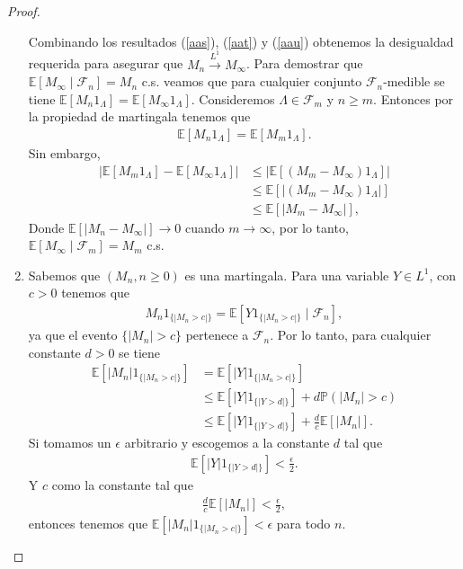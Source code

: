 \begin{proof}
\begin{enumerate}
Combinando los resultados (\ref{aas}), (\ref{aat}) y (\ref{aau}) obtenemos la desigualdad requerida para asegurar que $M_n \xrightarrow{L^1} M_{\infty}$. Para demostrar que $\mathbb{E}\left[M_{\infty} \mid \mathcal{F}_n\right] = M_n$ c.s. veamos que para cualquier conjunto $\mathcal{F}_n$-medible se tiene $\mathbb{E}[M_n 1_{\Lambda}] = \mathbb{E}[M_{\infty} 1_{\Lambda}]$. Consideremos $\Lambda \in \mathcal{F}_m$ y $n \geq m$. Entonces por la propiedad de martingala tenemos que
	\begin{align*}
	\mathbb{E}[M_n 1_{\Lambda}] = \mathbb{E}[M_m 1_{\Lambda}].
	\end{align*}
Sin embargo, 
	\begin{align*}
	|\mathbb{E}[M_m 1_{\Lambda}] - \mathbb{E}[M_{\infty} 1_{\Lambda}]| & \leq |\mathbb{E}[(M_m - M_{\infty}) 1_{\Lambda}]| \\
	& \leq \mathbb{E}[|(M_m - M_{\infty}) 1_{\Lambda}|] \\
	& \leq \mathbb{E}[|M_m - M_{\infty}|],
	\end{align*}
Donde $\mathbb{E}[|M_n - M_{\infty}|] \rightarrow 0$ cuando $m \rightarrow \infty$, por lo tanto, $\mathbb{E}[M_{\infty} \mid \mathcal{F}_m] = M_m$ c.s.

\item Sabemos que $(M_n, n \geq 0)$ es una martingala. Para una variable $Y \in L^1$, con $c > 0$ tenemos que
	\begin{align*}
	M_n 1_{\{|M_n > c|\}} = \mathbb{E}\left[Y1_{\{|M_n > c|\}} \mid \mathcal{F}_n\right],
	\end{align*}
ya que el evento $\{|M_n| > c\}$ pertenece a $\mathcal{F}_n$. Por lo tanto, para cualquier constante $d > 0$ se tiene
	\begin{align*}
	\mathbb{E}\left[|M_n| 1_{\{|M_n > c|\}}\right] & = \mathbb{E}\left[|Y|1_{\{|M_n > c|\}}\right] \\
	& \leq \mathbb{E}\left[|Y|1_{\{|Y > d|\}} \right] + d\mathbb{P}(|M_n| > c) \\
	& \leq \mathbb{E}\left[|Y|1_{\{|Y > d|\}} \right] + \frac{d}{c}\mathbb{E}[|M_n|].
	\end{align*}
Si tomamos un $\epsilon$ arbitrario y escogemos a la constante $d$ tal que 
	\begin{align*}
	\mathbb{E}\left[|Y|1_{\{|Y > d|\}}\right] < \frac{\epsilon}{2}.
	\end{align*}
Y $c$ como la constante tal que 
	\begin{align*}
	\frac{d}{c} \mathbb{E}[|M_n|] < \frac{\epsilon}{2},
	\end{align*}
	entonces tenemos que $\mathbb{E}[|M_n| 1_{\{|M_n > c|\}}] < \epsilon$ para todo $n$.
\end{enumerate}
\end{proof}

